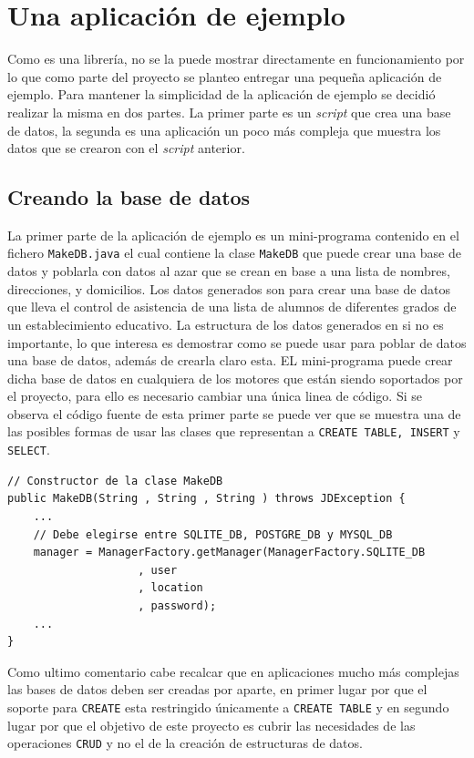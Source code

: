 \chapter{Una aplicación de ejemplo}
Como \jj es una librería, no se la puede mostrar directamente en funcionamiento por lo que como parte del proyecto se planteo entregar una pequeña aplicación de ejemplo. Para mantener la simplicidad de la aplicación de ejemplo se decidió realizar la misma en dos partes. La primer parte es un \textit{script} que crea una base de datos, la segunda es una aplicación un poco más compleja que muestra los datos que se crearon con el \textit{script} anterior.
\section{Creando la base de datos}
La primer parte de la aplicación de ejemplo es un mini-programa contenido en el fichero \verb=MakeDB.java= el cual contiene la clase \verb=MakeDB= que puede crear una base de datos y poblarla con datos al azar que se crean en base a una lista de nombres, direcciones, y domicilios. Los datos generados son para crear una base de datos que lleva el control de asistencia de una lista de alumnos de diferentes grados de un establecimiento educativo. La estructura de los datos generados en si no es importante, lo que interesa es demostrar como se puede usar \jj para poblar de datos una base de datos, además de crearla claro esta. EL mini-programa puede crear dicha base de datos en cualquiera de los motores que están siendo soportados por el proyecto, para ello es necesario cambiar una única linea de código. Si se observa el código fuente de esta primer parte se puede ver que se muestra una de las posibles formas de usar las clases que representan a \verb=CREATE TABLE, INSERT= y \verb=SELECT=.
\begin{lstlisting}[title=Código que debe alterarse para elegir el motor.]
// Constructor de la clase MakeDB
public MakeDB(String , String , String ) throws JDException {
	...
	// Debe elegirse entre SQLITE_DB, POSTGRE_DB y MYSQL_DB
	manager = ManagerFactory.getManager(ManagerFactory.SQLITE_DB
					, user
					, location
					, password);
	...
}
\end{lstlisting}

Como ultimo comentario cabe recalcar que en aplicaciones mucho más complejas las bases de datos deben ser creadas por aparte, en primer lugar por que el soporte para \verb=CREATE= esta restringido únicamente a \verb=CREATE TABLE= y en segundo lugar por que el objetivo de este proyecto es cubrir las necesidades de las operaciones \verb=CRUD= y no el de la creación de estructuras de datos.
